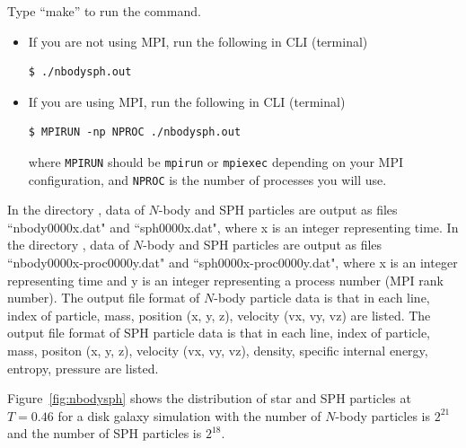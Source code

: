\label{s3sec:NbodySPH_make}
Type ``make'' to run the  command.

\label{s3sec:NbodySPH_execution}
\begin{itemize}
\item If you are not using MPI, run the following in CLI (terminal)
\begin{screen}
\begin{verbatim}
$ ./nbodysph.out
\end{verbatim}
\end{screen}
  
\item If you are using MPI, run the following in CLI (terminal)
\begin{screen}
\begin{verbatim}
$ MPIRUN -np NPROC ./nbodysph.out
\end{verbatim}
\end{screen}
where \texttt{MPIRUN} should be \texttt{mpirun} or \texttt{mpiexec} depending on your MPI configuration, and \texttt{NPROC} is the number of processes you will use.
\end{itemize}

\label{s3sec:NbodySPH_result_analysis}
\ifCpp %
In the directory , data of $N$-body and SPH particles are output as files ``nbody0000x.dat" and ``sph0000x.dat", where x is an integer representing time.
\endifCpp
\ifIF %
In the directory , data of $N$-body and SPH particles are output as files ``nbody0000x-proc0000y.dat" and ``sph0000x-proc0000y.dat", where x is an integer representing time and y is an integer representing a process number (MPI rank number).
\endifIF
The output file format of $N$-body particle data is that in each line, index of particle, mass, position (x, y, z), velocity (vx, vy, vz) are listed. The output file format of SPH particle data is that in each line, index of particle, mass, positon (x, y, z), velocity (vx, vy, vz), density, specific internal energy, entropy, pressure are listed.

Figure~\ref{fig:nbodysph} shows the distribution of star and SPH particles at $T=0.46$ for a disk galaxy simulation with the number of $N$-body particles is $2^{21}$ and the number of SPH particles is $2^{18}$.

